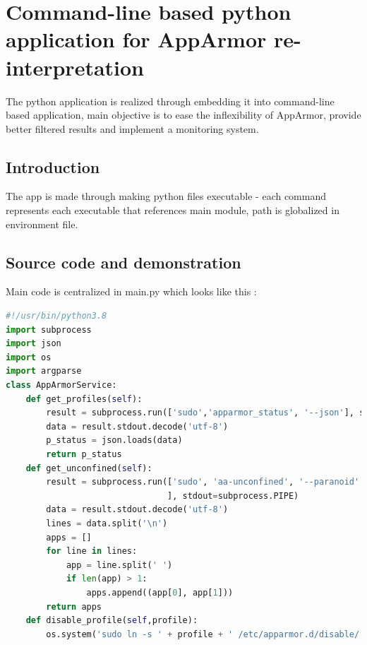\documentclass[12pt,a4paper]{article} %
\begin{document}
\section{Command-line based python application for AppArmor re-interpretation}

The python application is realized through embedding it into command-line based application, main objective is to ease the inflexibility of AppArmor, provide better filtered results and implement a monitoring system.

\subsection{Introduction}
The app is made through making python files executable - each command represents each executable that references main module, path is globalized in environment file.

\subsection{Source code and demonstration}

Main code is centralized in main.py which looks like this : 
\begin{mdframed}[backgroundcolor=light-gray, roundcorner=10pt,leftmargin=1, rightmargin=1, innerleftmargin=15, innertopmargin=15,innerbottommargin=15, outerlinewidth=1, linecolor=light-gray] \begin{lstlisting}[language=python]
#!/usr/bin/python3.8
import subprocess
import json
import os
import argparse
class AppArmorService:
    def get_profiles(self):
	    result = subprocess.run(['sudo','apparmor_status', '--json'], stdout=subprocess.PIPE)    
	    data = result.stdout.decode('utf-8')
	    p_status = json.loads(data)
	    return p_status
    def get_unconfined(self):
        result = subprocess.run(['sudo', 'aa-unconfined', '--paranoid'
                                ], stdout=subprocess.PIPE)
        data = result.stdout.decode('utf-8')
        lines = data.split('\n')
        apps = []
        for line in lines:
            app = line.split(' ')
            if len(app) > 1:
                apps.append((app[0], app[1]))
        return apps
    def disable_profile(self,profile):
        os.system('sudo ln -s ' + profile + ' /etc/apparmor.d/disable/')]
\end{lstlisting} \end{mdframed}
\end{document}

